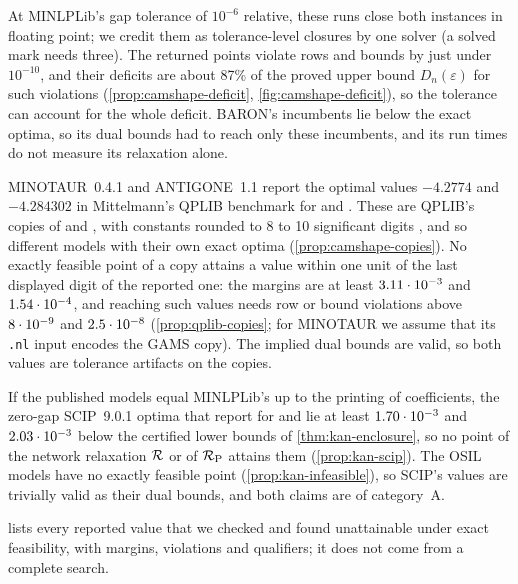At MINLPLib's gap tolerance of $10^{-6}$ relative, these runs close both instances in floating point; we credit them as tolerance-level closures by one solver (a solved mark needs three).
The returned points violate rows and bounds by just under $10^{-10}$, and their deficits are about 87\% of the proved upper bound $D_n(\varepsilon)$ for such violations (\cref{prop:camshape-deficit}, \cref{fig:camshape-deficit}), so the tolerance can account for the whole deficit.
BARON's incumbents lie below the exact optima, so its dual bounds had to reach only these incumbents, and its run times do not measure its relaxation alone.

MINOTAUR~0.4.1 and ANTIGONE~1.1 report the optimal values $-4.2774$ and $-4.284302$ in Mittelmann's QPLIB benchmark \citep{mittelmann2026-continuous-non-convex-qplib-benchmark} for  and .
These are QPLIB's copies of  and , with constants rounded to 8 to 10 significant digits \citep{furini2018-qplib-a-library-of-quadratic,cache2026-qplib-pages-and-rounded-camshape}, and so different models with their own exact optima (\cref{prop:camshape-copies}).
No exactly feasible point of a copy attains a value within one unit of the last displayed digit of the reported one: the margins are at least $3.11\cdot 10^{-3}$ and $1.54\cdot 10^{-4}$, and reaching such values needs row or bound violations above $8\cdot 10^{-9}$ and $2.5\cdot 10^{-8}$ (\cref{prop:qplib-copies}; for MINOTAUR we assume that its \texttt{.nl} input encodes the GAMS copy).
The implied dual bounds are valid, so both values are tolerance artifacts on the copies.

If the published models equal MINLPLib's up to the printing of coefficients, the zero-gap SCIP~9.0.1 optima that \citet{karia2025-deterministic-global-optimization-over-trained} report for  and  \citep{karia2025-karia-et-al-zenodo-default} lie at least $1.70\cdot 10^{-3}$ and $2.03\cdot 10^{-3}$ below the certified lower bounds of \cref{thm:kan-enclosure}, so no point of the network relaxation $\mathcal{R}$ or of $\mathcal{R}_{\mathrm{P}}$ attains them (\cref{prop:kan-scip}).
The OSIL models have no exactly feasible point (\cref{prop:kan-infeasible}), so SCIP's values are trivially valid as their dual bounds, and both claims are of category~A.

 lists every reported value that we checked and found unattainable under exact feasibility, with margins, violations and qualifiers; it does not come from a complete search.


